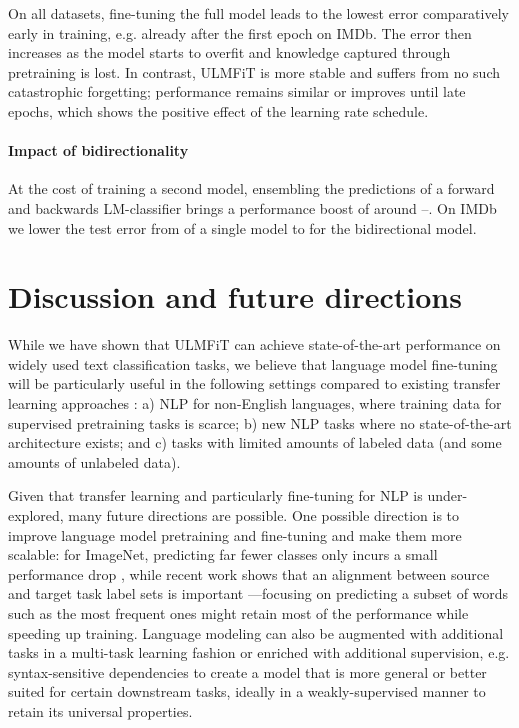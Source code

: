 \documentclass[11pt,a4paper]{article}
\begin{document}
On all datasets, fine-tuning the full model leads to the lowest error comparatively early in training, e.g. already after the first epoch on IMDb. The error then increases as the model starts to overfit and knowledge captured through pretraining is lost. In contrast, ULMFiT is more stable and suffers from no such catastrophic forgetting; performance remains similar or improves until late epochs, which shows the positive effect of the learning rate schedule.

\paragraph{Impact of bidirectionality} At the cost of training a second model, ensembling the predictions of a forward and backwards LM-classifier brings a performance boost of around --. On IMDb we lower the test error from  of a single model to  for the bidirectional model.

\section{Discussion and future directions}

While we have shown that ULMFiT can achieve state-of-the-art performance on widely used text classification tasks, we believe that language model fine-tuning will be particularly useful in the following settings compared to existing transfer learning approaches \cite{Conneau2017,Mccann2017,deepcontext2017}: a) NLP for non-English languages, where training data for supervised pretraining tasks is scarce; b) new NLP tasks where no state-of-the-art architecture exists; and c) tasks with limited amounts of labeled data (and some amounts of unlabeled data).

Given that transfer learning and particularly fine-tuning for NLP is under-explored, many future directions are possible. One possible direction is to improve language model pretraining and fine-tuning and make them more scalable: for ImageNet, predicting far fewer classes only incurs a small performance drop \cite{Huh2016}, while recent work shows that an alignment between source and target task label sets is important \cite{Mahajan2018}---focusing on predicting a subset of words such as the most frequent ones might retain most of the performance while speeding up training. Language modeling can also be augmented with additional tasks in a multi-task learning fashion \cite{Caruana1993} or enriched with additional supervision, e.g. syntax-sensitive dependencies \cite{linzen2016assessing} to create a model that is more general or better suited for certain downstream tasks, ideally in a weakly-supervised manner to retain its universal properties.
\end{document}
